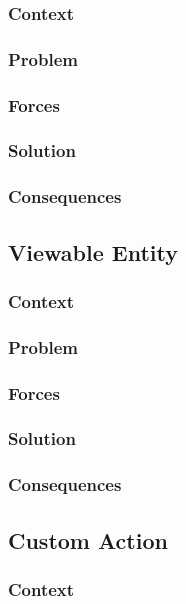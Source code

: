 \documentclass[sigconf]{acmart}
\begin{document}
\subsubsection*{Context}
\subsubsection*{Problem}
\subsubsection*{Forces}
\subsubsection*{Solution}
\subsubsection*{Consequences}


\subsection{Viewable Entity}
\subsubsection*{Context}
\subsubsection*{Problem}
\subsubsection*{Forces}
\subsubsection*{Solution}
\subsubsection*{Consequences}



\subsection{Custom Action}
\subsubsection*{Context}
\end{document}
